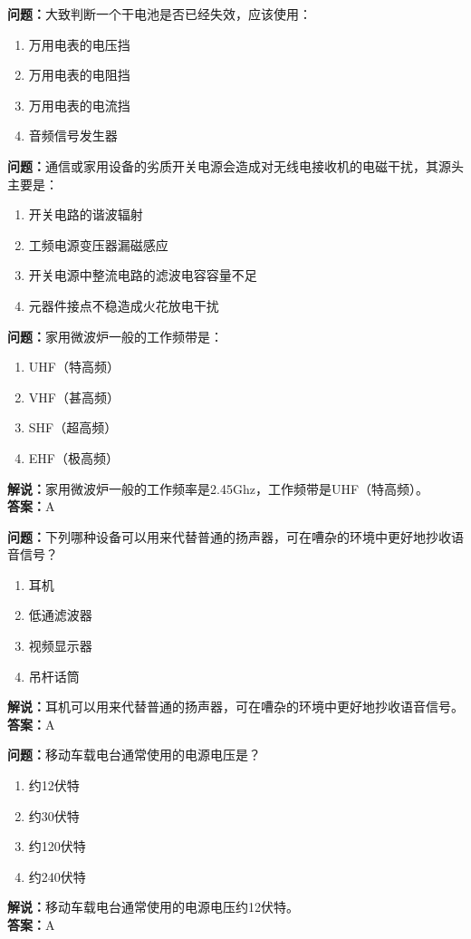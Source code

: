 \documentclass[UTF8]{ctexbook}
\begin{document}
\textbf{问题：}大致判断一个干电池是否已经失效，应该使用：
\begin{enumerate}[label=\Alph*), leftmargin=3em]
  \item 万用电表的电压挡
  \item 万用电表的电阻挡
  \item 万用电表的电流挡
  \item 音频信号发生器
\end{enumerate}

\textbf{问题：}通信或家用设备的劣质开关电源会造成对无线电接收机的电磁干扰，其源头主要是：
\begin{enumerate}[label=\Alph*), leftmargin=3em]
  \item 开关电路的谐波辐射
  \item 工频电源变压器漏磁感应
  \item 开关电源中整流电路的滤波电容容量不足
  \item 元器件接点不稳造成火花放电干扰
\end{enumerate}

\textbf{问题：}家用微波炉一般的工作频带是：
\begin{enumerate}[label=\Alph*), leftmargin=3em]
  \item UHF（特高频）
  \item VHF（甚高频）
  \item SHF（超高频）
  \item EHF（极高频）
\end{enumerate}
\textbf{解说：}家用微波炉一般的工作频率是2.45Ghz，工作频带是UHF（特高频）。\\
\textbf{答案：}A

\textbf{问题：}下列哪种设备可以用来代替普通的扬声器，可在嘈杂的环境中更好地抄收语音信号？
\begin{enumerate}[label=\Alph*), leftmargin=3em]
  \item 耳机
  \item 低通滤波器
  \item 视频显示器
  \item 吊杆话筒
\end{enumerate}
\textbf{解说：}耳机可以用来代替普通的扬声器，可在嘈杂的环境中更好地抄收语音信号。\\
\textbf{答案：}A

\textbf{问题：}移动车载电台通常使用的电源电压是？
\begin{enumerate}[label=\Alph*), leftmargin=3em]
  \item 约12伏特
  \item 约30伏特
  \item 约120伏特
  \item 约240伏特
\end{enumerate}
\textbf{解说：}移动车载电台通常使用的电源电压约12伏特。\\
\textbf{答案：}A
\end{document}
